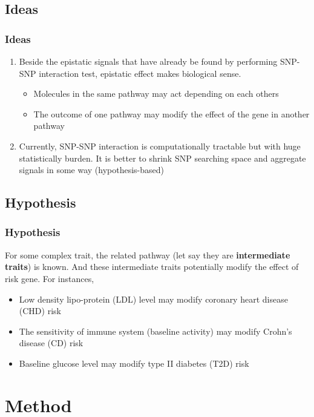 \documentclass{beamer}
\begin{document}
    \subsection{Ideas}
    \begin{frame}
    \frametitle{Ideas}
      \begin{enumerate}
        \item Beside the epistatic signals that have already be found by performing SNP-SNP interaction test, epistatic effect makes biological sense.
          \begin{itemize}
            \item Molecules in the same pathway may act depending on each others
            \item The outcome of one pathway may modify the effect of the gene in another pathway
          \end{itemize}
        \item Currently, SNP-SNP interaction is computationally tractable but with huge statistically burden. It is better to shrink SNP searching space and aggregate signals in some way (hypothesis-based)
      \end{enumerate}
    \end{frame}

    \subsection{Hypothesis}
    \begin{frame}
    \frametitle{Hypothesis}
      For some complex trait, the related pathway (let say they are \textbf{intermediate traits}) is known. And these intermediate traits potentially modify the effect of risk gene. For instances,
        \begin{itemize}
          \item Low density lipo-protein (LDL) level may modify coronary heart disease (CHD) risk
          \item The sensitivity of immune system (baseline activity) may modify Crohn's disease (CD) risk
          \item Baseline glucose level may modify type II diabetes (T2D) risk
        \end{itemize}
    \end{frame}

\section{Method}
\end{document}

